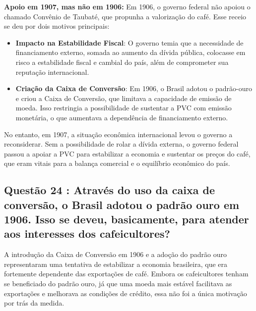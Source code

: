 \documentclass[a4paper,12pt]{article}[abntex2]
\begin{document}
\textbf{Apoio em 1907, mas não em 1906:} Em 1906, o governo federal não apoiou o chamado Convênio de Taubaté, que propunha a valorização do café. Esse receio se deu por dois motivos principais:

\begin{itemize}
    \item \textbf{Impacto na Estabilidade Fiscal}: O governo temia que a necessidade de financiamento externo, somada ao aumento da dívida pública, colocasse em risco a estabilidade fiscal e cambial do país, além de comprometer sua reputação internacional.
    \item \textbf{Criação da Caixa de Conversão}: Em 1906, o Brasil adotou o padrão-ouro e criou a Caixa de Conversão, que limitava a capacidade de emissão de moeda. Isso restringia a possibilidade de sustentar a PVC com emissão monetária, o que aumentava a dependência de financiamento externo.
\end{itemize}

No entanto, em 1907, a situação econômica internacional levou o governo a reconsiderar. Sem a possibilidade de rolar a dívida externa, o governo federal passou a apoiar a PVC para estabilizar a economia e sustentar os preços do café, que eram vitais para a balança comercial e o equilíbrio econômico do país.

\subsection{\textbf{Questão 24 : Através do uso da caixa de conversão, o Brasil adotou o padrão ouro em 1906. Isso se deveu, basicamente, para atender aos interesses dos cafeicultores?}}

A introdução da Caixa de Conversão em 1906 e a adoção do padrão ouro representaram uma tentativa de estabilizar a economia brasileira, que era fortemente dependente das exportações de café. Embora os cafeicultores tenham se beneficiado do padrão ouro, já que uma moeda mais estável facilitava as exportações e melhorava as condições de crédito, essa não foi a única motivação por trás da medida.
\end{document}
